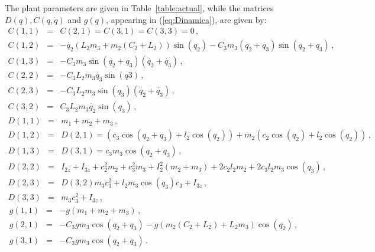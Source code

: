 \documentclass[letterpaper, 10 pt, journal, twocolumn]{IEEEtran}  %
\theoremstyle{plain}
\theoremstyle{definition}
\theoremstyle{remark}
\begin{document}
The plant parameters are given in Table~\ref{table:actual}, while the matrices $D(q), C(q,\dot{q})$ and $g(q)$, appearing in (\ref{eq:Dinamica}), are given by:
%
\begin{eqnarray}
C(1,1) &=&  C(2,1) = C(3,1)=C(3,3)=0\,, \nonumber\\
C(1,2) & =& -\dot{q_2}(L_2m_3+m_2(C_2+L_2)) \sin(q_2)-C_3m_3(\dot{q_2}+\dot{q_3}) \sin(q_2+q_3)\,, \nonumber\\
C(1,3) &=&  -C_3 m_3 \sin(q_2+q_3)(\dot{q_2}+\dot{q_3})\,, \nonumber\\
C(2,2) &=&  -C_3 L_2 m_3\dot{q_3} \sin(q3)\,, \nonumber\\
C(2,3) &=&  -C_3 L_2 m_3 \sin(q_3)(\dot{q_2}+\dot{q_3})\,, \nonumber\\
C(3,2) &=&  C_3 L_2 m_3\dot{q_2} \sin(q_3)\,,\label{eq:defC}
\end{eqnarray}
%
%
\begin{eqnarray}
D(1,1) &=& m_1 + m_2 + m_3 \,, \nonumber \\
D(1,2) &=& D(2,1) = (c_3 \cos(q_2+q_3) + l_2 \cos(q_2)) + m_2 (c_2 \cos(q_2) + l_2 \cos (q_2) )\,, \nonumber \\
D(1,3) &=& D(3,1) = c_3 m_3 \cos( q_2 + q_3) \,, \nonumber \\
D(2,2) &=& I_{2z} + I_{3z} + c_2^2 m_2 + c_3^2 m_3 + I_2^2 (m_2 + m_3) + 2 c_2 l_2 m_2 + 2 c_3 l_2 m_3 \cos (q_3)\,, \nonumber\\
D(2,3) &=& D(3,2) m_3 c_3^2 + l_2 m_3 \cos (q_3 ) c_3 + I_{3z} \,,\nonumber \\
D(3,3) &=&  m_3 c_3^2 + I_{3z}\,,\label{eq:defD}
\end{eqnarray}
%
\begin{eqnarray}
g(1,1) &=&  -g(m_1+m_2+m_3)\,, \nonumber\\
g(2,1) &=&  -C_3 g m_3 \cos(q_2+q_3)-g (m_2(C_2+L_2)+L_2 m_3) \cos(q_2)\,, \nonumber\\
g(3,1) &=&  -C_3 g m_3 \cos(q_2+q_3)\,.
\label{eq:defg}
\end{eqnarray}
%
%
\end{document}
